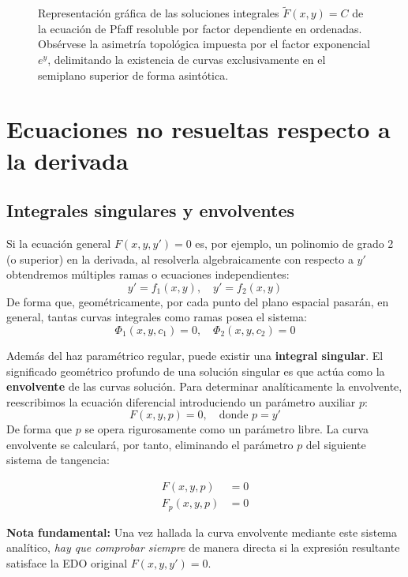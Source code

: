\begin{tcolorbox}
\begin{figure}[H]
    \centering
    
    \caption{Representación gráfica de las soluciones integrales $\tilde{F}(x,y) = C$ de la ecuación de Pfaff resoluble por factor dependiente en ordenadas. Obsérvese la asimetría topológica impuesta por el factor exponencial $e^y$, delimitando la existencia de curvas exclusivamente en el semiplano superior de forma asintótica.}
\end{figure}
\end{tcolorbox}
\newpage

\section{Ecuaciones no resueltas respecto a la derivada}

\subsection{Integrales singulares y envolventes}

Si la ecuación general $F(x,y,y') = 0$ es, por ejemplo, un polinomio de grado 2 (o superior) en la derivada, al resolverla algebraicamente con respecto a $y'$ obtendremos múltiples ramas o ecuaciones independientes:
$$ y' = f_1(x,y), \quad y' = f_2(x,y) $$
De forma que, geométricamente, por cada punto del plano espacial pasarán, en general, tantas curvas integrales como ramas posea el sistema:
$$ \Phi_1(x,y,c_1) = 0, \quad \Phi_2(x,y,c_2) = 0 $$

Además del haz paramétrico regular, puede existir una \textbf{integral singular}. El significado geométrico profundo de una solución singular es que actúa como la \textbf{envolvente} de las curvas solución. Para determinar analíticamente la envolvente, reescribimos la ecuación diferencial introduciendo un parámetro auxiliar $p$:
$$ F(x,y,p) = 0, \quad \text{donde } p = y' $$
De forma que $p$ se opera rigurosamente como un parámetro libre. La curva envolvente se calculará, por tanto, eliminando el parámetro $p$ del siguiente sistema de tangencia:

\begin{align*}
    F(x,y,p) &= 0 \\
    F_p(x,y,p) &= 0
\end{align*}

\textbf{Nota fundamental:} Una vez hallada la curva envolvente mediante este sistema analítico, \textit{hay que comprobar siempre} de manera directa si la expresión resultante satisface la EDO original $F(x,y,y') = 0$.

